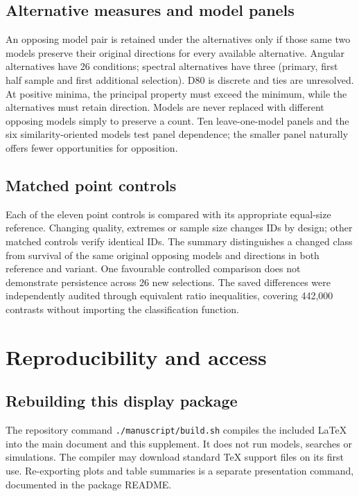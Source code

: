 \documentclass[12pt]{article}
\begin{document}
\subsection{Alternative measures and model panels}
An opposing model pair is retained under the alternatives only if those same two models preserve their original directions for every available alternative. Angular alternatives have 26 conditions; spectral alternatives have three (primary, first half sample and first additional selection). D80 is discrete and ties are unresolved. At positive minima, the principal property must exceed the minimum, while the alternatives must retain direction. Models are never replaced with different opposing models simply to preserve a count. Ten leave-one-model panels and the six similarity-oriented models test panel dependence; the smaller panel naturally offers fewer opportunities for opposition.

\FloatBarrier
\subsection{Matched point controls}
Each of the eleven point controls is compared with its appropriate equal-size reference. Changing quality, extremes or sample size changes IDs by design; other matched controls verify identical IDs. The summary distinguishes a changed class from survival of the same original opposing models and directions in both reference and variant. One favourable controlled comparison does not demonstrate persistence across 26 new selections. The saved differences were independently audited through equivalent ratio inequalities, covering 442,000 contrasts without importing the classification function.

\FloatBarrier

\section{Reproducibility and access}

\subsection{Rebuilding this display package}
The repository command \nolinkurl{./manuscript/build.sh} compiles the included LaTeX into the main document and this supplement. It does not run models, searches or simulations. The compiler may download standard TeX support files on its first use. Re-exporting plots and table summaries is a separate presentation command, documented in the package README.
\end{document}

